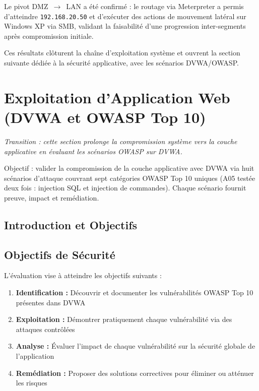 \documentclass[12pt,a4paper,openany]{report}
\begin{document}
	Le pivot DMZ~$\rightarrow$~LAN a été confirmé : le routage via Meterpreter a permis d'atteindre \texttt{192.168.20.50} et d'exécuter des actions de mouvement latéral sur Windows XP via SMB, validant la faisabilité d'une progression inter-segments après compromission initiale.
	
	Ces résultats clôturent la chaîne d'exploitation système et ouvrent la section suivante dédiée à la sécurité applicative, avec les scénarios DVWA/OWASP.
	
	\section{Exploitation d'Application Web (DVWA et OWASP Top 10)}
	\label{sec:dvwa}
	
	\noindent\textit{Transition : cette section prolonge la compromission système vers la couche applicative en évaluant les scénarios OWASP sur DVWA.}
	
	\begin{tcolorbox}[colback=primary!5!white, colframe=primary, title=\textbf{Objectifs du Chapitre}]
		Objectif : valider la compromission de la couche applicative avec DVWA via huit scénarios d'attaque couvrant sept catégories OWASP Top 10 uniques (A05 testée deux fois : injection SQL et injection de commandes). Chaque scénario fournit preuve, impact et remédiation.
	\end{tcolorbox}
	
	\subsection{Introduction et Objectifs}
	
	\subsection{Objectifs de Sécurité}
	
	L'évaluation vise à atteindre les objectifs suivants :
	
	\begin{enumerate}
		\item \textbf{Identification :} Découvrir et documenter les vulnérabilités OWASP Top 10 présentes dans DVWA
		\item \textbf{Exploitation :} Démontrer pratiquement chaque vulnérabilité via des attaques contrôlées
		\item \textbf{Analyse :} Évaluer l'impact de chaque vulnérabilité sur la sécurité globale de l'application
		\item \textbf{Remédiation :} Proposer des solutions correctives pour éliminer ou atténuer les risques
	\end{enumerate}
	
\end{document}
